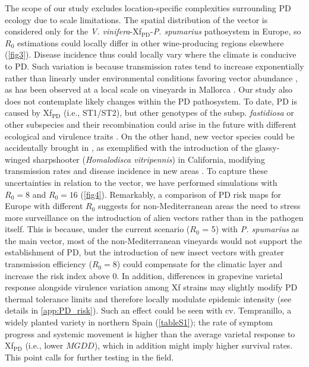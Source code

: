     The scope of our study excludes location-specific complexities surrounding
    PD
    ecology due to scale limitations. The spatial distribution of the vector is
    considered only for the \textit{V. vinifera}-Xf$_{\textrm{PD}}$-{\textit{P.
        spumarius}} pathosystem in Europe, so $R_0$ estimations could locally
    differ in
    other wine-producing regions elsewhere (\cref{fig3}). Disease incidence
    thus
    could locally vary where the climate is conducive to PD. Such variation is
    because transmission rates tend to increase exponentially rather than
    linearly
    under environmental conditions favoring vector abundance
    \cite{Gruber2012}, as
    has been observed at a local scale on vineyards in Mallorca
    \cite{Moralejo2019}.
    Our study also does not contemplate likely changes within the PD
    pathosystem.
    To date, PD is caused by Xf$_{\textrm{PD}}$ (i.e., ST1/ST2), but other
    genotypes of the subsp. \textit{fastidiosa} or other subspecies and their
    recombination could arise in the future with different ecological and
    virulence traits \cite{Vanhove2019}. On the other hand, new vector species
    could be accidentally brought in \cite{Redak2004}, as exemplified with the
    introduction of the glassy-winged sharpshooter (\textit{Homalodisca
        vitripennis}) in California, modifying transmission rates and disease
    incidence
    in new areas \cite{Daugherty2019}. To capture these uncertainties in
    relation
    to the vector, we have performed simulations with $R_0 = 8$ and $R_0 = 16$
    (\cref{fig4}). Remarkably, a comparison of PD risk maps for Europe with
    different $R_0$ suggests for non-Mediterranean areas the need to stress
    more
    surveillance on the introduction of alien vectors rather than in the
    pathogen
    itself. This is because, under the current scenario ($R_0$ = 5) with
    \textit{P.
        spumarius} as the main vector, most of the non-Mediterranean vineyards
    would
    not support the establishment of PD, but the introduction of new insect
    vectors
    with greater transmission efficiency ($R_0=8$) could compensate for the
    climatic layer and increase the risk index above 0. In addition,
    differences in
    grapevine varietal response alongside virulence variation among Xf strains
    may
    slightly modify PD thermal tolerance limits and therefore locally modulate
    epidemic intensity (see details in \cref{app:PD_risk}). Such an
    effect
    could be seen with cv. Tempranillo, a widely planted variety in northern
    Spain
    (\cref{tableS1}); the rate of symptom progress and systemic
    movement is
    higher than the average varietal response to Xf$_{\textrm{PD}}$ (i.e.,
    lower
$MGDD$), which in addition might imply higher survival rates. This point calls
    for further testing in the field.

